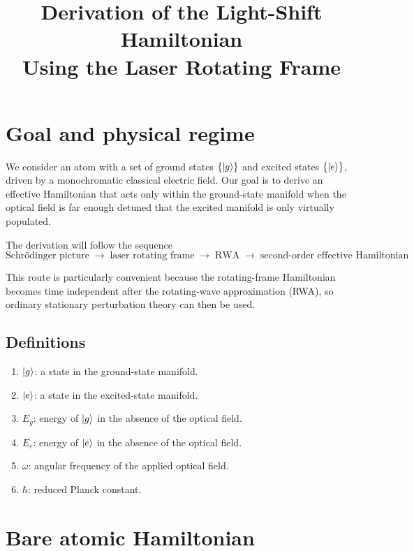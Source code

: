 \documentclass[11pt]{article}
\title{Derivation of the Light-Shift Hamiltonian\\Using the Laser Rotating Frame}
\author{}
\date{}
\begin{document}
\maketitle

\section{Goal and physical regime}

We consider an atom with a set of ground states $\{\ket{g}\}$ and excited states $\{\ket{e}\}$, driven by a monochromatic classical electric field. Our goal is to derive an effective Hamiltonian that acts only within the ground-state manifold when the optical field is far enough detuned that the excited manifold is only virtually populated.

The derivation will follow the sequence
\begin{equation}
\boxed{
\text{Schr\"odinger picture}
\;\longrightarrow\;
\text{laser rotating frame}
\;\longrightarrow\;
\text{RWA}
\;\longrightarrow\;
\text{second-order effective Hamiltonian}
}
\label{eq:roadmap}
\end{equation}

This route is particularly convenient because the rotating-frame Hamiltonian becomes time independent after the rotating-wave approximation (RWA), so ordinary stationary perturbation theory can then be used.

\subsection*{Definitions}
\begin{enumerate}[label=\textbf{D\arabic*.}]
\item $\ket{g}$: a state in the ground-state manifold.
\item $\ket{e}$: a state in the excited-state manifold.
\item $E_g$: energy of $\ket{g}$ in the absence of the optical field.
\item $E_e$: energy of $\ket{e}$ in the absence of the optical field.
\item $\omega$: angular frequency of the applied optical field.
\item $\hbar$: reduced Planck constant.
\end{enumerate}

\section{Bare atomic Hamiltonian}
\end{document}
